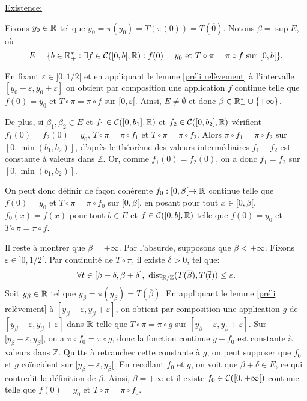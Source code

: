 	\par \underline{Existence:}
	\par Fixons $y_0 \in {\mathbb{R}}$ tel que $\overline{y_0}= \pi(y_0)=T(\pi(0))=T(\overline{0})$. Notons $\beta = \sup E$, où
	$$E=\lbrace b \in {\mathbb{R}}^*_+:\exists f \in \mathcal{C}([0,b[,{\mathbb{R}}):f(0)=y_0\text{ et }T \circ \pi = \pi \circ f \text{ sur }[0,b[\rbrace.$$

	\par En fixant $\varepsilon \in ]0,1/2[$ et en appliquant le lemme \ref{préli relèvement} à l'intervalle $[y_0-\varepsilon,y_0+\varepsilon]$ on obtient par composition une application $f$ continue  telle que $f(0)=y_0$ et $T \circ \pi = \pi \circ f$ sur $[0,\varepsilon[$. Ainsi, $E\neq \emptyset$ et donc $\beta \in {\mathbb{R}}^*_+ \cup \lbrace + \infty \rbrace$.\\

	\par De plus, si $\beta_1,\beta_2 \in E$ et $f_1 \in \mathcal{C}([0,b_1], {\mathbb{R}})$ et $f_2\in \mathcal{C}([0,b_2], {\mathbb{R}})$ vérifient $f_1(0)=f_2(0)=y_0$, $T \circ \pi = \pi \circ f_1$ et $T \circ \pi = \pi \circ f_2$. Alors $\pi \circ f_1 = \pi \circ f_2$ sur $[0, \min(b_1,b_2)]$, d'après le théorème des valeurs intermédiaires $f_1 - f_2$ est constante à valeurs dans $\mathbb{Z}$. Or, comme $f_1(0)=f_2(0)$, on a donc $f_1 = f_2$ sur $[0, \min(b_1,b_2)]$. \\

	\par On peut donc définir de façon cohérente $f_0:[0,\beta[\to {\mathbb{R}}$ continue telle que $f(0)=y_0$ et $T \circ \pi = \pi \circ f_0$ sur $[0,\beta[$, en posant pour tout $x\in [0,\beta[$, $f_0(x)=f(x)$ pour tout $b\in E$ et $f \in \mathcal{C}([0,b],{\mathbb{R}})$ telle que $f(0)=y_0$ et $T \circ \pi = \pi \circ f$.\\

	\par Il reste à montrer que $\beta = + \infty$. Par l'absurde, supposons que $\beta < + \infty$. Fixons $\varepsilon \in ]0,1/2[$. Par continuité de $T\circ\pi$, il existe $\delta >0$, tel que:
	$$\forall t \in [\beta - \delta,\beta +\delta], \
	\mathrm{dist}_{{\mathbb{R}}/\mathbb{Z}}(T(\overline{\beta}),T(\overline{t}))\leq
	\varepsilon.$$ Soit $y_{\beta}\in {\mathbb{R}}$ tel que
	$\overline{y_\beta}=\pi(y_\beta)=T(\overline{\beta})$. En appliquant le lemme
	\ref{préli relèvement} à $[y_\beta-\varepsilon,y_\beta+\varepsilon]$, on
	obtient par composition une application $g$ de $[y_\beta -\varepsilon,y_\beta
	+ \varepsilon]$ dans ${\mathbb{R}}$ telle que $T\circ\pi=\pi \circ g$ sur $[y_\beta
	-\varepsilon,y_\beta + \varepsilon]$. Sur $[y_\beta - \varepsilon, y_\beta[$,
	on a $\pi\circ f_0= \pi \circ g$, donc la fonction continue $g-f_0$ est
	constante à valeurs dans $\mathbb{Z}$. Quitte à retrancher cette constante à
	$g$, on peut supposer que $f_0$ et $g$ coïncident sur $[y_\beta - \varepsilon,
	y_\beta[$. En recollant $f_0$ et $g$, on voit que $\beta + \delta \in E$, ce
	qui contredit la définition de $\beta$. Ainsi, $\beta = + \infty$ et il existe
	$f_0 \in \mathcal{C}([0,+\infty[)$ continue telle que $f(0)=y_0$ et $T \circ \pi = \pi
	\circ f_0$.\\

